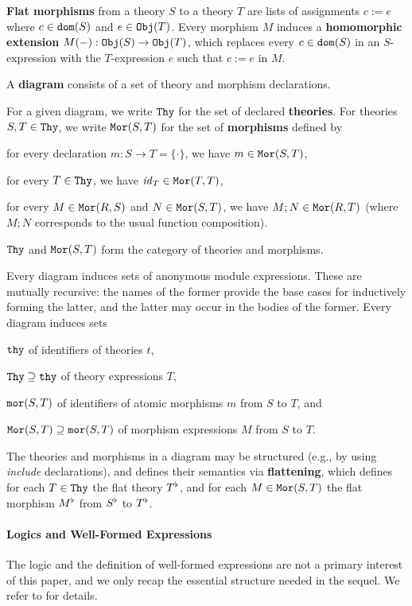 \textbf{Flat morphisms} from a theory $S$ to a theory $T$ are lists of assignments $c:=e$ where $c\in\mathtt{dom}(S)$ and $e\in\mathtt{Obj}(T)$.
Every morphism $M$ induces a \textbf{homomorphic extension} $M(-):\mathtt{Obj}(S)\to\mathtt{Obj}(T)$, which replaces every $c\in\mathtt{dom}(S)$ in an $S$-expression with the $T$-expression $e$ such that $c:=e$ in $M$.

A \textbf{diagram} consists of a set of theory and morphism declarations.
\begin{nomodexp}
For a given diagram, we write $\mathtt{Thy}$ for the set of declared \textbf{theories}.
For theories $S,T\in\mathtt{Thy}$, we write $\mathtt{Mor}(S,T)$ for the set of \textbf{morphisms} defined by
\begin{compactitem}
 \item for every declaration $m:S\to T=\{\cdot\}$, we have $m\in\mathtt{Mor}(S,T)$,
 \item for every $T\in\mathtt{Thy}$, we have $\mathit{id}_{T}\in\mathtt{Mor}(T,T)$,
 \item for every $M\in\mathtt{Mor}(R,S)$ and $N\in\mathtt{Mor}(S,T)$, we have $M;N\in\mathtt{Mor}(R,T)$ (where $M;N$ corresponds to the usual function composition).
\end{compactitem}
$\mathtt{Thy}$ and $\mathtt{Mor}(S,T)$ form the category of theories and morphisms.
\end{nomodexp}
\begin{modexp}
Every diagram induces sets of anonymous module expressions.
These are mutually recursive: the names of the former provide the base cases for inductively forming the latter, and the latter may occur in the bodies of the former.
Every diagram induces sets
\begin{compactitem}
 \item $\mathtt{thy}$ of identifiers of theories $t$,
 \item $\mathtt{Thy}\supseteq \mathtt{thy}$ of theory expressions $T$,
 \item $\mathtt{mor}(S,T)$ of identifiers of atomic morphisms $m$ from $S$ to $T$, and
 \item $\mathtt{Mor}(S,T)\supseteq\mathtt{mor}(S,T)$ of morphism expressions $M$ from $S$ to $T$.
\end{compactitem}
\end{modexp}

The theories and morphisms in a diagram may be structured (e.g., by using \emph{include} declarations), and \mmt defines their semantics via \textbf{flattening}, which defines for each $T\in\mathtt{Thy}$ the flat theory $T^\flat$, and for each $M\in\mathtt{Mor}(S,T)$ the flat morphism $M^\flat$ from $S^\flat$ to $T^\flat$.

\paragraph{Logics and Well-Formed Expressions}
The logic and the definition of well-formed expressions are not a primary interest of this paper, and we only recap the essential structure needed in the sequel.
We refer to \cite{rabe:howto:14} for details.

